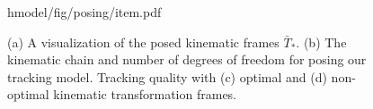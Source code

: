 \begin{figure}[t!]
\centering
\begin{overpic} 
[width=\linewidth]
{hmodel/fig/posing/item.pdf}
\end{overpic}
\caption{
% 
% 
(a) A visualization of the posed kinematic frames ${\bar{T}}_*$.
(b) The kinematic chain and number of degrees of freedom for posing our tracking model.
Tracking quality with (c) optimal and (d) non-optimal kinematic transformation frames. 
% 
% 
}
\label{fig:posing}
\end{figure}